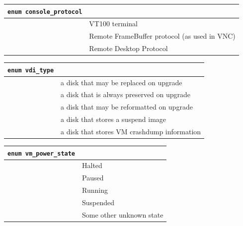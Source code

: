 \vspace{1cm}
\begin{longtable}{|ll|}
\hline
{\tt enum console\_protocol} & \\
\hline
\hspace{0.5cm}{\tt vt100} & VT100 terminal \\
\hspace{0.5cm}{\tt rfb} & Remote FrameBuffer protocol (as used in VNC) \\
\hspace{0.5cm}{\tt rdp} & Remote Desktop Protocol \\
\hline
\end{longtable}

\vspace{1cm}
\begin{longtable}{|ll|}
\hline
{\tt enum vdi\_type} & \\
\hline
\hspace{0.5cm}{\tt system} & a disk that may be replaced on upgrade \\
\hspace{0.5cm}{\tt user} & a disk that is always preserved on upgrade \\
\hspace{0.5cm}{\tt ephemeral} & a disk that may be reformatted on upgrade \\
\hspace{0.5cm}{\tt suspend} & a disk that stores a suspend image \\
\hspace{0.5cm}{\tt crashdump} & a disk that stores VM crashdump information \\
\hline
\end{longtable}

\vspace{1cm}
\begin{longtable}{|ll|}
\hline
{\tt enum vm\_power\_state} & \\
\hline
\hspace{0.5cm}{\tt Halted} & Halted \\
\hspace{0.5cm}{\tt Paused} & Paused \\
\hspace{0.5cm}{\tt Running} & Running \\
\hspace{0.5cm}{\tt Suspended} & Suspended \\
\hspace{0.5cm}{\tt Unknown} & Some other unknown state \\
\hline
\end{longtable}

